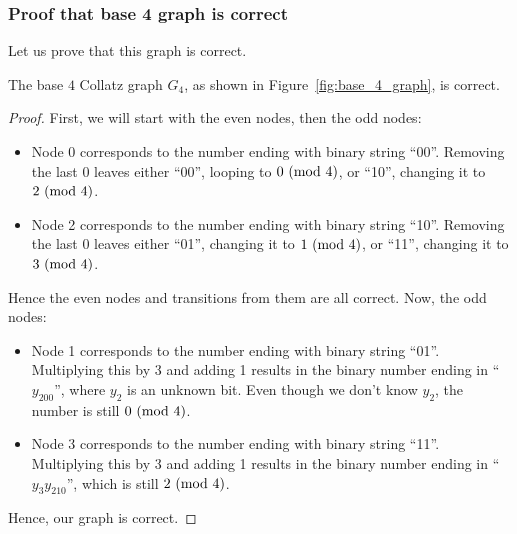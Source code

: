 \subsubsection{Proof that base 4 graph is correct} \label{subsubsec:proofbase4graph}
Let us prove that this graph is correct.
\begin{theorem}
The base $4$ Collatz graph $G_4$, as shown in Figure~\ref{fig:base_4_graph}, is correct.
\end{theorem}
\begin{proof}
First, we will start with the even nodes, then the odd nodes:
\begin{itemize}
    \item Node 0 corresponds to the number ending with binary string ``00''. Removing the last 0 leaves either ``00'', looping to $0\ (\mathrm{mod}\ 4)$, or ``10'', changing it to $2\ (\mathrm{mod}\ 4)$.
    \item Node 2 corresponds to the number ending with binary string ``10''. Removing the last 0 leaves either ``01'', changing it to $1\ (\mathrm{mod}\ 4)$, or ``11'', changing it to $3\ (\mathrm{mod}\ 4)$.
\end{itemize}
Hence the even nodes and transitions from them are all correct. Now, the odd nodes:
\begin{itemize}
    \item Node 1 corresponds to the number ending with binary string ``01''. Multiplying this by 3 and adding 1 results in the binary number ending in ``$y_200$'', where $y_2$ is an unknown bit. Even though we don't know $y_2$, the number is still $0\ (\mathrm{mod}\ 4)$.
    \item Node 3 corresponds to the number ending with binary string ``11''. Multiplying this by 3 and adding 1 results in the binary number ending in ``$y_3y_210$'', which is still $2\ (\mathrm{mod}\ 4)$.
\end{itemize}
Hence, our graph is correct.
\end{proof}
